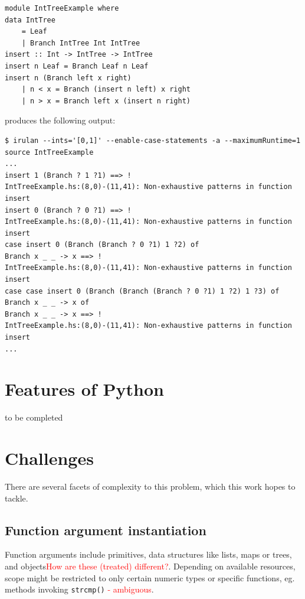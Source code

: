 \documentclass{icldt}
\numberwithin{equation}{section}       %
\begin{document}
\begin{lstlisting}[language=HaskellUlisses,frame=single]
module IntTreeExample where
data IntTree
	= Leaf
	| Branch IntTree Int IntTree
insert :: Int -> IntTree -> IntTree
insert n Leaf = Branch Leaf n Leaf
insert n (Branch left x right)
	| n < x = Branch (insert n left) x right
	| n > x = Branch left x (insert n right)
\end{lstlisting}

produces the following output:
\begin{lstlisting}[language=HaskellUlisses,frame=single]
$ irulan --ints='[0,1]' --enable-case-statements -a --maximumRuntime=1 source IntTreeExample
...
insert 1 (Branch ? 1 ?1) ==> !
IntTreeExample.hs:(8,0)-(11,41): Non-exhaustive patterns in function insert
insert 0 (Branch ? 0 ?1) ==> !
IntTreeExample.hs:(8,0)-(11,41): Non-exhaustive patterns in function insert
case insert 0 (Branch (Branch ? 0 ?1) 1 ?2) of
Branch x _ _ -> x ==> !
IntTreeExample.hs:(8,0)-(11,41): Non-exhaustive patterns in function insert
case case insert 0 (Branch (Branch (Branch ? 0 ?1) 1 ?2) 1 ?3) of
Branch x _ _ -> x of
Branch x _ _ -> x ==> !
IntTreeExample.hs:(8,0)-(11,41): Non-exhaustive patterns in function insert
...
\end{lstlisting}
\section{Features of Python}
\label{sect:python-features}
to be completed
\section{Challenges}
\label{sect:challenges}
There are several facets of complexity to this problem, which this work hopes to tackle.
\subsection{Function argument instantiation}
Function arguments include primitives, data structures like lists, maps or trees, and objects\textcolor{red}{How are these (treated) different?}. Depending on available resources, scope might be restricted to only certain numeric types or specific functions, eg. methods invoking \texttt{strcmp()}\textcolor{red}{ - ambiguous}.
\end{document}
